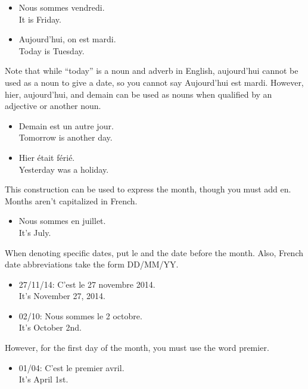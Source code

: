 \begin{itemize}
  \item  Nous sommes vendredi. \\ It is Friday.
  \item  Aujourd'hui, on est mardi. \\ Today is Tuesday.
\end{itemize}

Note that while ``today'' is a noun and adverb in English, aujourd'hui cannot be used as a noun to give a date, so you cannot say Aujourd'hui est mardi. However, hier, aujourd'hui, and demain can be used as nouns when qualified by an adjective or another noun.

\begin{itemize}
  \item  Demain est un autre jour. \\ Tomorrow is another day.
  \item  Hier {\'e}tait f{\'e}ri{\'e}. \\ Yesterday was a holiday.
\end{itemize}

This construction can be used to express the month, though you must add en. Months aren't capitalized in French.

\begin{itemize}
  \item  Nous sommes en juillet. \\ It's July.
\end{itemize}

When denoting specific dates, put le and the date before the month. Also, French date abbreviations take the form DD/MM/YY.

\begin{itemize}
  \item  27/11/14: C'est le 27 novembre 2014. \\ It's November 27, 2014.
  \item  02/10: Nous sommes le 2 octobre. \\ It's October 2nd.
\end{itemize}

However, for the first day of the month, you must use the word premier.

\begin{itemize}
  \item  01/04: C'est le premier avril. \\ It's April 1st.
\end{itemize}

